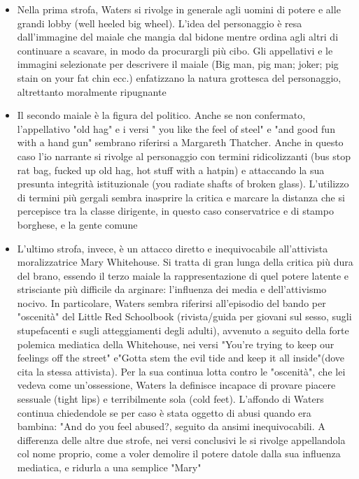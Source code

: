 \documentclass[class=book, crop=false, oneside, 12pt]{standalone}
\begin{document}
    \begin{itemize}
    \item Nella prima strofa, Waters si rivolge in generale agli uomini di potere e alle grandi lobby (well heeled big wheel). L'idea del personaggio è resa dall'immagine del maiale che mangia dal bidone mentre ordina agli altri di continuare a scavare, in modo da procurargli più cibo. Gli appellativi e le immagini selezionate per descrivere il maiale (Big man, pig man; joker; pig stain on your fat chin ecc.) enfatizzano la natura grottesca del personaggio, altrettanto moralmente ripugnante
    \item Il secondo maiale è la figura del politico. Anche se non confermato, l'appellativo "old hag" e i versi " you like the feel of steel" e "and good fun with a hand gun" sembrano riferirsi a Margareth Thatcher. Anche in questo caso l'io narrante si rivolge al personaggio con termini ridicolizzanti (bus stop rat bag, fucked up old hag, hot stuff with a hatpin) e attaccando la sua presunta integrità istituzionale (you radiate shafts of broken glass). L'utilizzo di termini più gergali sembra inasprire la critica e marcare la distanza che si percepisce tra la classe dirigente, in questo caso conservatrice e di stampo borghese, e la gente comune
    \item L'ultimo strofa, invece, è un attacco diretto e inequivocabile all'attivista moralizzatrice Mary Whitehouse. Si tratta di gran lunga della critica più dura del brano, essendo il terzo maiale la rappresentazione di quel potere latente e strisciante più difficile da arginare: l'influenza dei media e dell'attivismo nocivo. In particolare, Waters sembra riferirsi all'episodio del bando per "oscenità" del Little Red Schoolbook (rivista/guida per giovani sul sesso, sugli stupefacenti e sugli atteggiamenti degli adulti), avvenuto a seguito della forte polemica mediatica della Whitehouse, nei versi "You're trying to keep our feelings off the street" e"Gotta stem the evil tide and keep it all inside"(dove cita la stessa attivista). Per la sua continua lotta contro le "oscenità", che lei vedeva come un'ossessione, Waters la definisce incapace di provare piacere sessuale (tight lips) e terribilmente sola (cold feet). L'affondo di Waters continua chiedendole se per caso è stata oggetto di abusi quando era bambina: "And do you feel abused?, seguito da ansimi inequivocabili. A differenza delle altre due strofe, nei versi conclusivi le si rivolge appellandola col nome proprio, come a voler demolire il potere datole dalla sua influenza mediatica, e ridurla a una semplice "Mary"
    \end{itemize}
\end{document}
